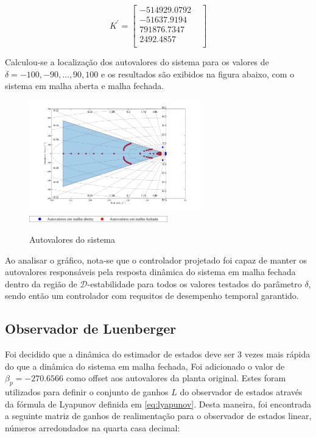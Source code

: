 \begin{equation*} \label{eq:ganhoscontrolador}
    K^'=
    \begin{bmatrix}
        -514929.0792&\\	
        -51637.9194&\\	
        791876.7347&\\
        2492.4857&\\
    \end{bmatrix}
\end{equation*}

Calculou-se a localização dos autovalores do sistema para os valores de $\delta = -100, -90, \dots, 90, 100$ e os resultados são exibidos na figura abaixo, com o sistema em malha aberta e malha fechada.
\FloatBarrier
\begin{figure}[htbp]
    \begin{centering}
    \includegraphics[width=7.5cm]{img/regiao_d_estabilidade_autoval.png}
    \includegraphics[width=6cm]{img/regiao_d_estabilidade_autoval_leg.png}
    \caption{Autovalores do sistema}
    \label{fig:regiao_d_estabilidade_autoval_leg}
    \end{centering}
\end{figure}
\FloatBarrier

Ao analisar o gráfico, nota-se que o controlador projetado foi capaz de manter os autovalores responsáveis pela resposta dinâmica do sistema em malha fechada dentro da região de \( \mathcal{D}\)-estabilidade para todos os valores testados do parâmetro $\delta$, sendo então um controlador com requsitos de desempenho temporal garantido.
\subsection{Observador de Luenberger}
Foi decidido que a dinâmica do estimador de estados deve ser 3 vezes  mais rápida do que a dinâmica do sistema em malha fechada, Foi adicionado o valor de $\beta_p=-270.6566$ como offset aos autovalores da planta original.
Estes foram utilizados para definir o conjunto de ganhos $L$ do observador de estados através da fórmula de Lyapunov definida em \eqref{eq:lyapunov}. 
Desta maneira, foi encontrada a seguinte matriz de ganhos de realimentação para o observador de estados linear, números arredondados na quarta casa decimal:

